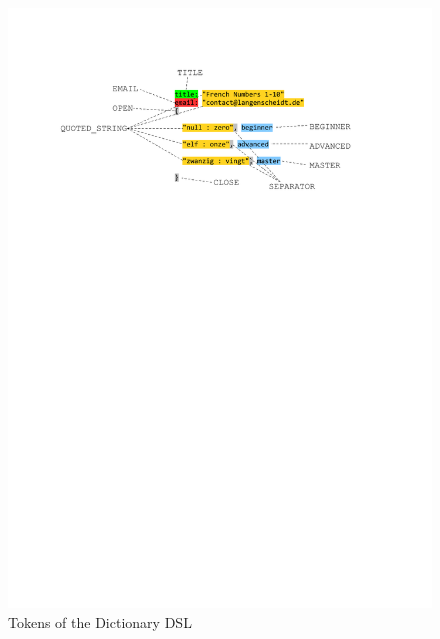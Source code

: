 \begin{figure}[htp]
\begin{center}
 \includegraphics[width=\textwidth]{pics/moca/2TextToMocaTree/4-tokens}
  \caption{Tokens of the Dictionary DSL}
  \label{moca-4-Tokens}
\end{center}
\end{figure}
   
